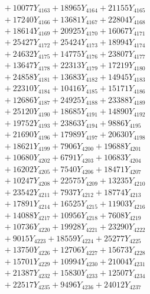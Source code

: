 \documentclass[a4paper,10pt]{article}
\begin{document}
{\begin{align}
&\;  + 10077 Y_{4163} + 18965 Y_{4164} + 21155 Y_{4165} \\[0.3ex]
&\;  + 17240 Y_{4166} + 13681 Y_{4167} + 22804 Y_{4168} \\[0.5ex]\allowbreak
&\;  + 18614 Y_{4169} + 20925 Y_{4170} + 16067 Y_{4171} \\[0.3ex]
&\;  + 25427 Y_{4172} + 25424 Y_{4173} + 18994 Y_{4174} \\[0.3ex]
&\;  + 24632 Y_{4175} + 14775 Y_{4176} + 23807 Y_{4177} \\[0.3ex]
&\;  + 13647 Y_{4178} + 22313 Y_{4179} + 17219 Y_{4180} \\[0.3ex]
&\;  + 24858 Y_{4181} + 13683 Y_{4182} + 14945 Y_{4183} \\[0.3ex]
&\;  + 22310 Y_{4184} + 10416 Y_{4185} + 15171 Y_{4186} \\[0.3ex]
&\;  + 12686 Y_{4187} + 24925 Y_{4188} + 23388 Y_{4189} \\[0.3ex]
&\;  + 25120 Y_{4190} + 18685 Y_{4191} + 14890 Y_{4192} \\[0.3ex]
&\;  + 19752 Y_{4193} + 23863 Y_{4194} + 9886 Y_{4195} \\[0.3ex]
&\;  + 21690 Y_{4196} + 17989 Y_{4197} + 20630 Y_{4198} \\[0.5ex]\allowbreak
&\;  + 18621 Y_{4199} + 7906 Y_{4200} + 19688 Y_{4201} \\[0.3ex]
&\;  + 10680 Y_{4202} + 6791 Y_{4203} + 10683 Y_{4204} \\[0.3ex]
&\;  + 16202 Y_{4205} + 7540 Y_{4206} + 18471 Y_{4207} \\[0.3ex]
&\;  + 10247 Y_{4208} + 22575 Y_{4209} + 13235 Y_{4210} \\[0.3ex]
&\;  + 23542 Y_{4211} + 7937 Y_{4212} + 18774 Y_{4213} \\[0.3ex]
&\;  + 17891 Y_{4214} + 16525 Y_{4215} + 11903 Y_{4216} \\[0.3ex]
&\;  + 14088 Y_{4217} + 10956 Y_{4218} + 7608 Y_{4219} \\[0.3ex]
&\;  + 10736 Y_{4220} + 19928 Y_{4221} + 23290 Y_{4222} \\[0.3ex]
&\;  + 9015 Y_{4223} + 18559 Y_{4224} + 25277 Y_{4225} \\[0.3ex]
&\;  + 13750 Y_{4226} + 12706 Y_{4227} + 15673 Y_{4228} \\[0.5ex]\allowbreak
&\;  + 15701 Y_{4229} + 10994 Y_{4230} + 21004 Y_{4231} \\[0.3ex]
&\;  + 21387 Y_{4232} + 15830 Y_{4233} + 12507 Y_{4234} \\[0.3ex]
&\;  + 22517 Y_{4235} + 9496 Y_{4236} + 24012 Y_{4237} \\[0.3ex]

\end{align}}
\end{document}
